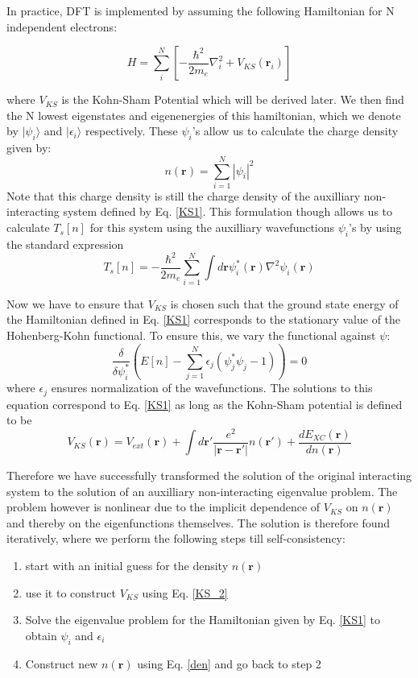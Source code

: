 \documentclass[12pt,letter]{article}
\newcommand{\ra}{\rangle}
\newcommand{\rmb}{\mathbf{r}}
\newcommand{\dens}{n(\rmb)}
\begin{document}
In practice, DFT is implemented by  assuming the following Hamiltonian for N independent electrons:

\begin{equation} \label{KS1}
H=\sum_{i}^{N} \left[ -\dfrac{\hbar^2}{2m_e}\nabla_i^2 +V_{KS}(\rmb_i)\right]
\end{equation}

 where $V_{KS}$ is the Kohn-Sham Potential which will be derived later. We then find the N lowest eigenstates and eigenenergies of this hamiltonian, which we denote by $|\psi_i\ra$
 and $|\epsilon_i\ra$ respectively. These $\psi_i$'s allow us to calculate the charge density given by:
 \begin{equation}\label{den}
 \dens=\sum_{i=1}^{N} |\psi_i|^2
 \end{equation}
  Note that this charge density is still the charge density of the auxilliary non-interacting system defined by Eq. \ref{KS1}. This formulation though allows us to calculate $T_s[n]$ for this system using the auxilliary wavefunctions $\psi_i$'s by using the standard expression
 \begin{equation}
 T_s[n]=-\dfrac{\hbar^2}{2m_e} \sum_{i=1}^{N} \int d\rmb \psi^*_i(\rmb) \nabla^2 \psi_i(\rmb)
 \end{equation}
 
 Now we have to ensure that $V_{KS}$ is chosen such that the ground state energy of the Hamiltonian defined in Eq. \ref{KS1} corresponds to the stationary value of the Hohenberg-Kohn functional. To ensure this, we vary the functional against  $\psi$:
 \begin{equation}
  \dfrac{\delta}{\delta \psi_i^*}\left( E[n] - \sum_{j=1}^{N} \epsilon_j (\psi^*_j \psi_j -1) \right)=0
  \end{equation} 
  where $\epsilon_j$ ensures normalization of the wavefunctions. The solutions to this equation correspond to Eq. \ref{KS1} as long as the Kohn-Sham potential is defined to be
 \begin{equation}\label{KS_2}
 V_{KS}(\rmb)=V_{ext}(\rmb) + \int d\rmb' \dfrac{e^2}{|\rmb -\rmb'|} n(\rmb') + \dfrac{d E_{XC}(\rmb)}{d\dens}
 \end{equation}

Therefore we have successfully transformed the solution of the original interacting system to the solution of an auxilliary non-interacting eigenvalue problem. The problem however is nonlinear due to the implicit dependence of $V_{KS}$ on $\dens$ and thereby on the eigenfunctions themselves. The solution is therefore found iteratively, where we perform the following steps till self-consistency:
\begin{enumerate}
\item start with an initial guess for the density $\dens$
\item use it to construct $V_{KS}$ using Eq. \ref{KS_2}
\item Solve the eigenvalue problem for the Hamiltonian given by Eq. \ref{KS1} to obtain $\psi_i$ and $\epsilon_i$ 
\item Construct new $\dens$ using Eq. \ref{den} and go back to step 2
\end{enumerate}
\end{document}
